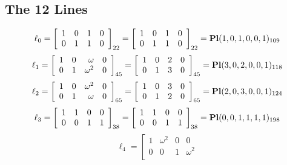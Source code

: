 \documentclass{article}
\begin{document}
{\subsection*{The 12 Lines}
$$
\ell_{0} = 
\left[
\begin{array}{*{4}{r}}
1 & 0 & 1 & 0\\
0 & 1 & 1 & 0\\
\end{array}
\right]
_{22}
=
\left[
\begin{array}{*{4}c}
1  & 0  & 1  & 0\\
0  & 1  & 1  & 0\\
\end{array}
\right]_{22}
={\rm\bf Pl}(1,0,1,0,0,1 )_{109}$$
$$
\ell_{1} = 
\left[
\begin{array}{*{4}{r}}
1 & 0 & \omega  & 0\\
0 & 1 & \omega^{2} & 0\\
\end{array}
\right]
_{45}
=
\left[
\begin{array}{*{4}c}
1  & 0  & 2  & 0\\
0  & 1  & 3  & 0\\
\end{array}
\right]_{45}
={\rm\bf Pl}(3,0,2,0,0,1 )_{118}$$
$$
\ell_{2} = 
\left[
\begin{array}{*{4}{r}}
1 & 0 & \omega^{2} & 0\\
0 & 1 & \omega  & 0\\
\end{array}
\right]
_{65}
=
\left[
\begin{array}{*{4}c}
1  & 0  & 3  & 0\\
0  & 1  & 2  & 0\\
\end{array}
\right]_{65}
={\rm\bf Pl}(2,0,3,0,0,1 )_{124}$$
$$
\ell_{3} = 
\left[
\begin{array}{*{4}{r}}
1 & 1 & 0 & 0\\
0 & 0 & 1 & 1\\
\end{array}
\right]
_{38}
=
\left[
\begin{array}{*{4}c}
1  & 1  & 0  & 0\\
0  & 0  & 1  & 1\\
\end{array}
\right]_{38}
={\rm\bf Pl}(0,0,1,1,1,1 )_{198}$$
$$
\ell_{4} = 
\left[
\begin{array}{*{4}{r}}
1 & \omega^{2} & 0 & 0\\
0 & 0 & 1 & \omega^{2}\\

\end{array}$$}
\end{document}
